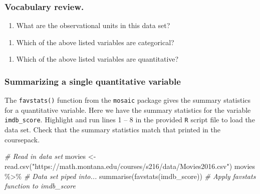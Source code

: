 \documentclass[
]{report}
\newenvironment{Shaded}{\begin{snugshade}}{\end{snugshade}}
\newcommand{\CommentTok}[1]{\textcolor[rgb]{0.56,0.35,0.01}{\textit{#1}}}
\newcommand{\FunctionTok}[1]{\textcolor[rgb]{0.00,0.00,0.00}{#1}}
\newcommand{\NormalTok}[1]{#1}
\newcommand{\OtherTok}[1]{\textcolor[rgb]{0.56,0.35,0.01}{#1}}
\newcommand{\SpecialCharTok}[1]{\textcolor[rgb]{0.00,0.00,0.00}{#1}}
\newcommand{\StringTok}[1]{\textcolor[rgb]{0.31,0.60,0.02}{#1}}
\providecommand{\tightlist}{%
  \setlength{\itemsep}{0pt}\setlength{\parskip}{0pt}}
\begin{document}
\newpage

\hypertarget{vocabulary-review.}{%
\subsubsection*{Vocabulary review.}\label{vocabulary-review.}}

\begin{enumerate}
\def\labelenumi{\arabic{enumi}.}
\tightlist
\item
  What are the observational units in this data set?
\end{enumerate}

\vspace{0.1in}

\begin{enumerate}
\def\labelenumi{\arabic{enumi}.}
\setcounter{enumi}{1}
\tightlist
\item
  Which of the above listed variables are categorical?
\end{enumerate}

\vspace{.5in}

\begin{enumerate}
\def\labelenumi{\arabic{enumi}.}
\setcounter{enumi}{2}
\tightlist
\item
  Which of the above listed variables are quantitative?
\end{enumerate}

\vspace{.5in}

\hypertarget{summarizing-a-single-quantitative-variable}{%
\subsubsection*{Summarizing a single quantitative variable}\label{summarizing-a-single-quantitative-variable}}

The \texttt{favstats()} function from the \texttt{mosaic} package gives the summary statistics for a quantitative variable. Here we have the summary statistics for the variable \texttt{imdb\_score}. Highlight and run lines 1 -- 8 in the provided \texttt{R} script file to load the data set. Check that the summary statistics match that printed in the coursepack.

\begin{Shaded}
\begin{Highlighting}[]
\CommentTok{\# Read in data set}
\NormalTok{movies }\OtherTok{\textless{}{-}} \FunctionTok{read.csv}\NormalTok{(}\StringTok{"https://math.montana.edu/courses/s216/data/Movies2016.csv"}\NormalTok{) }
\NormalTok{movies }\SpecialCharTok{\%\textgreater{}\%} \CommentTok{\# Data set piped into...}
  \FunctionTok{summarise}\NormalTok{(}\FunctionTok{favstats}\NormalTok{(imdb\_score)) }\CommentTok{\# Apply favstats function to imdb\_score}
\end{Highlighting}
\end{Shaded}
\end{document}
